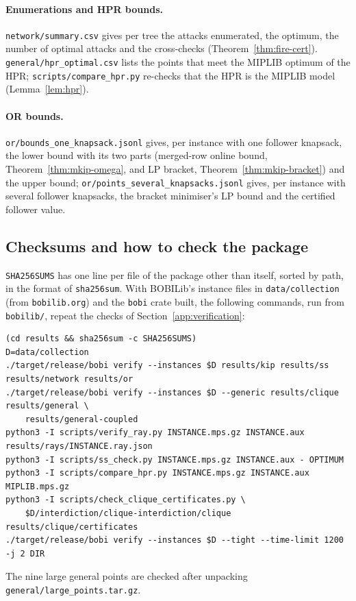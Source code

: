 \paragraph{Enumerations and HPR bounds.} \texttt{network/summary.csv} gives
per tree the attacks enumerated, the optimum, the number of optimal attacks
and the cross-checks (Theorem~\ref{thm:fire-cert}).
\texttt{general/hpr\_optimal.csv} lists the points that meet the MIPLIB
optimum of the HPR; \texttt{scripts/compare\_hpr.py} re-checks that the HPR is
the MIPLIB model (Lemma~\ref{lem:hpr}).

\paragraph{OR bounds.} \texttt{or/bounds\_one\_knapsack.jsonl} gives, per
instance with one follower knapsack, the lower bound with its two parts (merged-row
online bound, Theorem~\ref{thm:mkip-omega}, and LP bracket,
Theorem~\ref{thm:mkip-bracket}) and the upper bound;
\texttt{or/points\_several\_knapsacks.jsonl} gives, per instance with several
follower knapsacks, the bracket minimiser's LP bound and the certified
follower value.

\subsection{Checksums and how to check the package}

\texttt{SHA256SUMS} has one line per file of the package other than itself,
sorted by path, in the format of \texttt{sha256sum}. With BOBILib's instance
files in \texttt{data/collection} (from \texttt{bobilib.org}) and the
\texttt{bobi} crate built, the following commands, run from \texttt{bobilib/},
repeat the checks of Section~\ref{app:verification}:
\begin{center}
\begin{minipage}{0.96\linewidth}
\footnotesize
\begin{verbatim}
(cd results && sha256sum -c SHA256SUMS)
D=data/collection
./target/release/bobi verify --instances $D results/kip results/ss results/network results/or
./target/release/bobi verify --instances $D --generic results/clique results/general \
    results/general-coupled
python3 -I scripts/verify_ray.py INSTANCE.mps.gz INSTANCE.aux results/rays/INSTANCE.ray.json
python3 -I scripts/ss_check.py INSTANCE.mps.gz INSTANCE.aux - OPTIMUM
python3 -I scripts/compare_hpr.py INSTANCE.mps.gz INSTANCE.aux MIPLIB.mps.gz
python3 -I scripts/check_clique_certificates.py \
    $D/interdiction/clique-interdiction/clique results/clique/certificates
./target/release/bobi verify --instances $D --tight --time-limit 1200 -j 2 DIR
\end{verbatim}
\end{minipage}
\end{center}
The nine large general points are checked after unpacking
\texttt{general/large\_points.tar.gz}.
